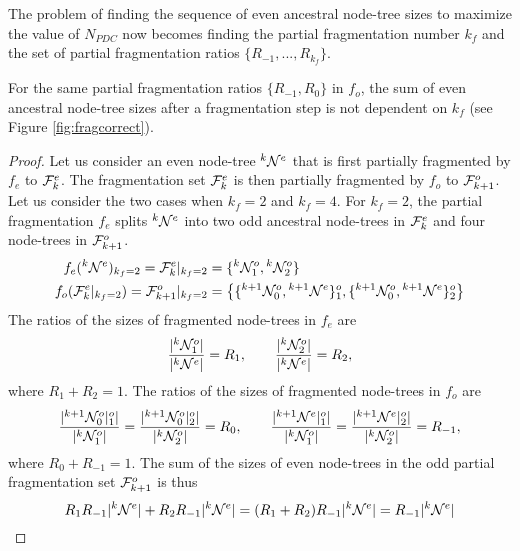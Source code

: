 The problem of finding the sequence of even ancestral node-tree sizes to maximize the value of $N_{PDC}$ now becomes finding the partial fragmentation number $k_f$ and the set of partial fragmentation ratios $\{R_{-1},..., R_{k_f}\}$.

\begin{lemma}\label{lem:sumevenkf}
  For the same partial fragmentation ratios $\{R_{-1}, R_0\}$ in $f_o$, the sum of even ancestral node-tree sizes after a fragmentation step is not dependent on $k_f$ (see Figure \ref{fig:fragcorrect}).
\end{lemma}
\begin{proof}
  Let us consider an even node-tree ${}^{k}\mathcal{N}^e$ that is first partially fragmented by $f_e$ to $\mathcal{F}^e_k$. The fragmentation set $\mathcal{F}^e_k$ is then partially fragmented by $f_o$ to $\mathcal{F}_{k+1}^o$. Let us consider the two cases when $k_f=2$ and $k_f=4$. For $k_f=2$, the partial fragmentation $f_e$ splits ${}^{k}\mathcal{N}^e$ into two odd ancestral node-trees in $\mathcal{F}^e_k$ and four node-trees in $\mathcal{F}_{k+1}^o$.
  \begin{align*}
    f_e({}^{k}\mathcal{N}^e)_{k_f = 2}
    = \mathcal{F}^e_{k}|_{k_f = 2}
     & = \{ {}^{k} \mathcal{N}^{o}_1, {}^{k} \mathcal{N}^{o}_2\}                                                                             \\
    f_o(\mathcal{F}^e_{k}|_{k_f = 2})
    = \mathcal{F}^o_{k+1}|_{k_f = 2}
     & = \left\{ \{{}^{k+1}\mathcal{N}^{o}_{0}, {}^{k+1}\mathcal{N}^{e}\}^o_1 , \{{}^{k+1}\mathcal{N}^{o}_{0}, {}^{k+1}\mathcal{N}^{e} \}^o_2 \right\}
  \end{align*}
  The ratios of the sizes of fragmented node-trees in $f_e$ are
  \begin{equation*}
    \frac{\lvert{}^{k} \mathcal{N}^{o}_1\rvert}{\lvert{}^{k}\mathcal{N}^e\rvert} = R_1, \hspace{2em}
    \frac{\lvert{}^{k} \mathcal{N}^{o}_2\rvert}{\lvert{}^{k}\mathcal{N}^e\rvert} = R_2,
  \end{equation*}
  where $ R_1 + R_2 = 1$. The ratios of the sizes of fragmented node-trees in $f_o$ are
  \begin{equation*}
    \frac{\lvert{}^{k+1}\mathcal{N}^{o}_0|^o_1\rvert}{\lvert{}^{k} \mathcal{N}^{o}_1\rvert} =
    \frac{\lvert{}^{k+1}\mathcal{N}^{o}_0|^o_2\rvert}{\lvert{}^{k} \mathcal{N}^{o}_2\rvert} = R_0, \hspace{2em}
    \frac{\lvert{}^{k+1}\mathcal{N}^{e}  |^o_1\rvert}{\lvert{}^{k} \mathcal{N}^{o}_1\rvert} =
    \frac{\lvert{}^{k+1}\mathcal{N}^{e}  |^o_2\rvert}{\lvert{}^{k} \mathcal{N}^{o}_2\rvert} = R_{-1},
  \end{equation*}
  where $R_0 + R_{-1} = 1$. The sum of the sizes of even node-trees in the odd partial fragmentation set $\mathcal{F}^o_{k+1}$ is thus
  \begin{equation*}
    R_1 R_{-1} \lvert{}^{k}\mathcal{N}^e\rvert + R_2 R_{-1} \lvert{}^{k}\mathcal{N}^e\rvert = (R_1 + R_2) R_{-1} \lvert{}^{k}\mathcal{N}^e\rvert = R_{-1} \lvert{}^{k}\mathcal{N}^e\rvert
  \end{equation*}


\end{proof}
